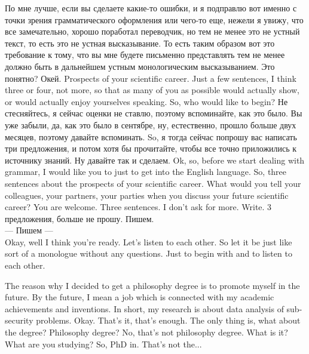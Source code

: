 \documentclass[main.tex]{subfiles}
\begin{document}
По мне лучше, если вы сделаете какие-то ошибки, и я подправлю вот именно с точки зрения грамматического оформления или чего-то еще, нежели я увижу, что все замечательно, хорошо поработал переводчик, но тем не менее это не устный текст, то есть это не устная высказывание.
То есть таким образом вот это требование к тому, что вы мне будете письменно представлять тем не менее должно быть в дальнейшем устным монологическим высказыванием. Это понятно? Окей. Prospects of your scientific career. Just a few sentences, I think three or four, not more, so that as many of you as possible would actually show, or would actually enjoy yourselves speaking.
So, who would like to begin?
Не стесняйтесь, я сейчас оценки не ставлю, поэтому вспоминайте, как это было.
Вы уже забыли, да, как это было в сентябре, ну, естественно, прошло больше двух месяцев, поэтому давайте вспоминать.
So, я тогда сейчас попрошу вас написать три предложения, и потом хотя бы прочитайте, чтобы все точно приложились к источнику знаний.
Ну давайте так и сделаем.
Ok, so, before we start dealing with grammar, I would like you to just to get into the English language.
So, three sentences about the prospects of your scientific career.
What would you tell your colleagues, your partners, your parties when you discuss your future scientific career?
You are welcome.
Three sentences.
I don't ask for more.
Write.
3 предложения, больше не прошу.
Пишем.
\\

--- Пишем ---
\\

Okay, well I think you're ready.
Let's listen to each other.
So let it be just like sort of a monologue without any questions.
Just to begin with and to listen to each other.

The reason why I decided to get a philosophy degree is to promote myself in the future.
By the future, I mean a job which is connected with my academic achievements and inventions.
In short, my research is about data analysis of sub-security problems.
Okay.
That's it, that's enough.
The only thing is, what about the degree? Philosophy degree? No, that's not philosophy degree.
What is it? What are you studying? So, PhD in.
That's not the...
\end{document}
